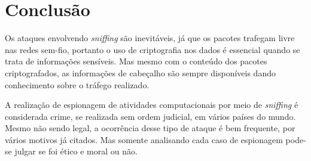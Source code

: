 \section{Conclusão \label{sec:conclusao}}

Os ataques envolvendo \textit{sniffing} são inevitáveis, já que os pacotes trafegam livre nas redes sem-fio, portanto o uso de criptografia nos dados é essencial quando se trata de informações sensíveis. Mas mesmo com o conteúdo dos pacotes criptografados, as informações de cabeçalho são sempre disponíveis dando conhecimento sobre o tráfego realizado.

A realização de espionagem de atividades computacionais por meio de \textit{sniffing} é considerada crime, se realizada sem ordem judicial, em vários países do mundo. Mesmo não sendo legal, a ocorrência desse tipo de ataque é bem frequente, por vários motivos já citados. Mas somente analisando cada caso de espionagem pode-se julgar se foi ético e moral ou não.
